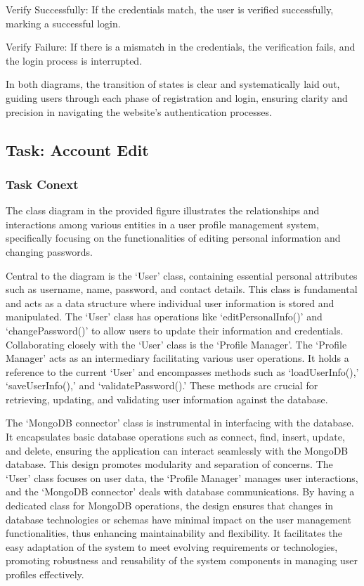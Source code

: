 \documentclass[conference]{IEEEtran}
\begin{document}
Verify Successfully: If the credentials match, the user is verified successfully, marking a successful login.

Verify Failure: If there is a mismatch in the credentials, the verification fails, and the login process is interrupted.

In both diagrams, the transition of states is clear and systematically laid out, guiding users through each phase of registration and login, ensuring clarity and precision in navigating the website’s authentication processes.


\subsection{\textbf{Task: Account Edit }}

\subsubsection{\textbf{Task Conext }}
\textbf{ }

The class diagram in the provided figure illustrates the relationships and interactions among various entities in a user profile management system, specifically focusing on the functionalities of editing personal information and changing passwords.

Central to the diagram is the ‘User’ class, containing essential personal attributes such as username, name, password, and contact details. This class is fundamental and acts as a data structure where individual user information is stored and manipulated. The ‘User’ class has operations like ‘editPersonalInfo()’ and ‘changePassword()’ to allow users to update their information and credentials.
Collaborating closely with the ‘User’ class is the ‘Profile Manager’. The ‘Profile Manager’ acts as an intermediary facilitating various user operations. It holds a reference to the current ‘User’ and encompasses methods such as ‘loadUserInfo(),’ ‘saveUserInfo(),’ and ‘validatePassword().’ These methods are crucial for retrieving, updating, and validating user information against the database.

The ‘MongoDB connector’ class is instrumental in interfacing with the database. It encapsulates basic database operations such as connect, find, insert, update, and delete, ensuring the application can interact seamlessly with the MongoDB database.
This design promotes modularity and separation of concerns. The ‘User’ class focuses on user data, the ‘Profile Manager’ manages user interactions, and the ‘MongoDB connector’ deals with database communications. By having a dedicated class for MongoDB operations, the design ensures that changes in database technologies or schemas have minimal impact on the user management functionalities, thus enhancing maintainability and flexibility. It facilitates the easy adaptation of the system to meet evolving requirements or technologies, promoting robustness and reusability of the system components in managing user profiles effectively.
\end{document}
